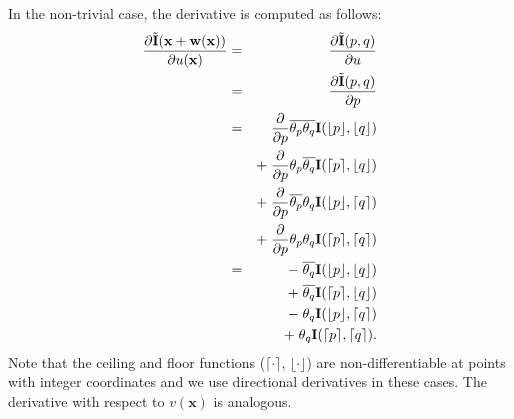 \documentclass[10pt,twocolumn,letterpaper]{article}%
\newcommand{\Aceil}[1]{\lceil #1 \rceil}%
\newcommand{\Afloor}[1]{\lfloor #1 \rfloor}%
\newcommand{\chairsSD}{\mbox{ChairsSDHom}\xspace}
\newcommand{\chairs}{\mbox{Chairs}\xspace}
\newcommand{\things}{\mbox{Things3D}\xspace}
\begin{document}
In the non-trivial case, the derivative is computed as follows: 
\begin{eqnarray} 
\frac{\partial \tilde{\mathbf{I}}(\mathbf{x}+\mathbf{w}(\mathbf{x}))}{\partial u(\mathbf{x})}
&=& \frac{\partial \tilde{\mathbf{I}}(p, q)}{\partial u} \nonumber \\
&=& \frac{\partial \tilde{\mathbf{I}}(p, q)}{\partial p} \nonumber \\
&=& \phantom{+\;} 
           \frac{\partial}{\partial p}\conj{\theta_p}\conj{\theta_q}\mathbf{I}(\Afloor{p}, \Afloor{q}) \nonumber \\
    && +\; \frac{\partial}{\partial p}\theta_p\conj{\theta_q} \mathbf{I}(\Aceil{p}, \Afloor{q}) \nonumber \\
    && +\; \frac{\partial}{\partial p}\conj{\theta_p}\theta_q \mathbf{I}(\Afloor{p}, \Aceil{q}) \nonumber \\
    && +\; \frac{\partial}{\partial p}\theta_p\theta_q \mathbf{I}(\Aceil{p}, \Aceil{q}) \nonumber \\
&=& -\;
           \conj{\theta_q}\mathbf{I}(\Afloor{p}, \Afloor{q}) \nonumber \\
    && +\; \conj{\theta_q} \mathbf{I}(\Aceil{p}, \Afloor{q}) \nonumber \\
    && -\; \theta_q \mathbf{I}(\Afloor{p}, \Aceil{q}) \nonumber \\
    && +\; \theta_q \mathbf{I}(\Aceil{p}, \Aceil{q}) \mbox{.}
\end{eqnarray} 
Note that the ceiling and floor functions ($\lceil\cdot\rceil$, $\lfloor\cdot\rfloor$) are non-differentiable at points with integer coordinates and we use directional derivatives in these cases. 
The derivative with respect to $v(\mathbf{x})$ is analogous. 






\end{document}
